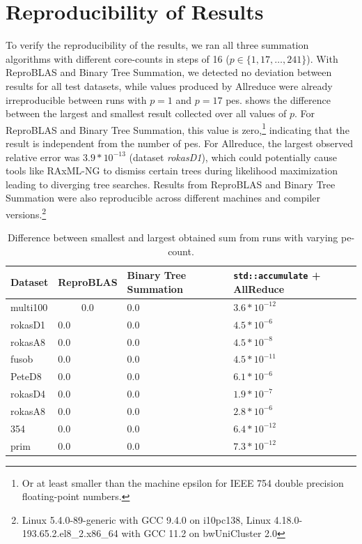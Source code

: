 \section{Reproducibility of Results}
\label{sec:VerificationOfReproducibility}
To verify the reproducibility of the results, we ran all three summation algorithms with different core-counts in steps of 16 ($p \in \{1, 17, \ldots, 241 \}$).
With ReproBLAS and Binary Tree Summation, we detected no deviation between results for all test datasets, while values produced by Allreduce were already  irreproducible between runs with $p=1$ and $p=17$ \glspl{pe}.
 shows the difference between the largest and smallest result collected over all values of $p$.
For ReproBLAS and Binary Tree Summation, this value is zero,\footnote{Or at least smaller than the machine epsilon for IEEE 754 double precision floating-point numbers.} indicating that the result is independent from the number of \glspl{pe}.
For Allreduce, the largest observed relative error was $3.9 * 10^{-13}$ (dataset \textit{rokasD1}), which could potentially cause tools like RAxML-NG to dismiss certain trees during likelihood maximization leading to diverging tree searches.
Results from ReproBLAS and Binary Tree Summation were also reproducible across different machines and compiler versions.\footnote{Linux 5.4.0-89-generic with GCC 9.4.0 on i10pc138, Linux 4.18.0-193.65.2.el8\_2.x86\_64 with GCC 11.2 on bwUniCluster 2.0}

\begin{table}
\caption{Difference between smallest and largest obtained sum from runs with varying \gls{pe}-count.}
\label{table:runDeviation}
\centering
\begin{tabular}{l|l|l|l}
\textbf{Dataset} & \textbf{ReproBLAS }& \textbf{Binary Tree Summation} & \texttt{std::accumulate}\textbf{ + AllReduce} \\
\hline
multi100 & $$0.0$$ & $0.0$ & $3.6 * 10^{-12}$ \\
rokasD1 & $0.0$ & $0.0$ & $4.5 * 10^{-6}$ \\
rokasA8 & $0.0$ & $0.0$ & $4.5 * 10^{-8}$ \\
fusob & $0.0$ & $0.0$ & $4.5 * 10^{-11}$ \\
PeteD8 & $0.0$ & $0.0$ & $6.1 * 10^{-6}$ \\
rokasD4 & $0.0$ & $0.0$ & $1.9 * 10^{-7}$ \\
rokasA8 & $0.0$ & $0.0$ & $2.8 * 10^{-6}$ \\
354 & $0.0$ & $0.0$ & $6.4 * 10^{-12}$ \\
prim & $0.0$ & $0.0$ & $7.3 * 10^{-12}$
\end{tabular}
\end{table}

